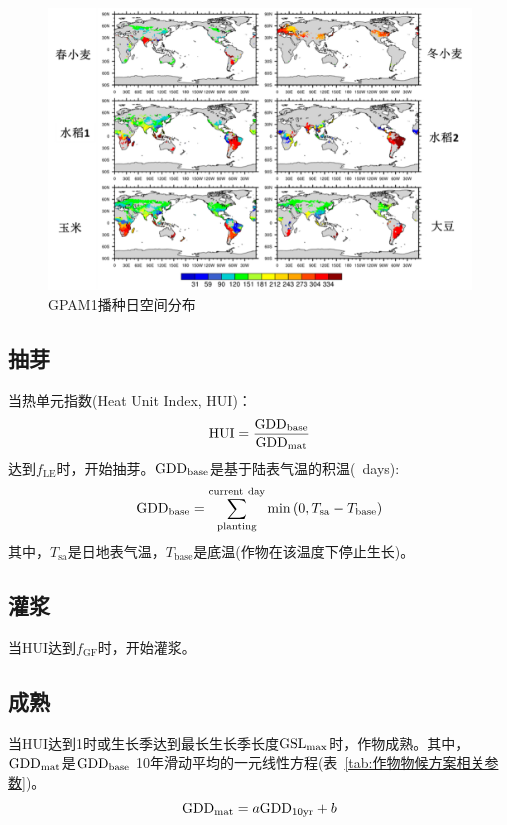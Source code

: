 {
\begin{figure}[htbp]
  \centering
  \includegraphics[scale=1.2]{Figures/作物模式/GPAM1播种日空间分布.png}
  \caption{GPAM1播种日空间分布}
  \label{fig:GPAM1播种日空间分布}
\end{figure}
}

\subsection{抽芽}
当热单元指数(Heat Unit Index, ${\mathrm {HUI}}$)：
\begin{equation}\label{HUI}
  {\mathrm {HUI}}=\frac{{\rm GDD}_{\mathrm{base}}}{{\rm GDD}_{\mathrm{mat}}}
\end{equation}
达到$f_{\mathrm{LE}}$时，开始抽芽。${\rm GDD}_{\mathrm{base}}$是基于陆表气温的积温(\textcelsius\ days):
\begin{equation}
  {\rm GDD}_{\mathrm{ {base }}}=\sum_{\mathrm{planting}}^{\rm current\ day} \min \left(0, T_{\mathrm{sa}}-T_{\mathrm{base}}\right)
\end{equation}
其中，$T_{\mathrm{sa}}$是日地表气温，$T_{\mathrm{base}}$是底温(作物在该温度下停止生长)。

\subsection{灌浆}
当${\mathrm {HUI}}$达到$f_{\mathrm{GF}}$时，开始灌浆。

\subsection{成熟}
当${\mathrm {HUI}}$达到1时或生长季达到最长生长季长度${\rm GSL}_{\mathrm{max}}$时，作物成熟。其中，${\rm GDD}_{\mathrm{mat}}$是${\rm GDD}_{\mathrm{base}}$
10年滑动平均的一元线性方程(表~\ref{tab:作物物候方案相关参数})。
\begin{equation}
  {\rm GDD}_{\mathrm{mat}}=a {\rm GDD}_{\rm 10yr}+b
\end{equation}

